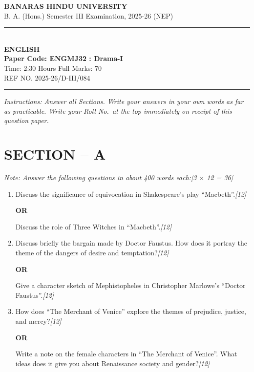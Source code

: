 \documentclass[11pt,a4paper]{article}
\newcommand{\pts}[1]{\hfill \textit{[#1]}}
\begin{document}
\begin{center}
  {\large\bfseries BANARAS HINDU UNIVERSITY}\\[2pt]
  {\normalsize B. A. (Hons.) Semester III Examination, 2025-26 (NEP)}\\[6pt]
  \rule{0.8\linewidth}{0.5pt}\\[6pt]
  {\large\bfseries ENGLISH}\\[4pt]
  {\large\bfseries Paper Code: ENGMJ32 : Drama-I}\\[4pt]
  {\normalsize Time: 2:30 Hours \hfill Full Marks: 70}\\[2pt]
  {\small REF NO. 2025-26/D-III/084}
\end{center}
\rule{\linewidth}{0.4pt}
\smallskip

\noindent \textit{Instructions: Answer all Sections. Write your answers in your own words as far as practicable. Write your Roll No.\ at the top immediately on receipt of this question paper.}

\bigskip

\section*{SECTION -- A}
\noindent \textit{Note: Answer the following questions in about 400 words each:}\pts{3 $\times$ 12 = 36}

\begin{enumerate}[label=\textbf{\arabic*.},leftmargin=*,itemsep=12pt]

  \item Discuss the significance of equivocation in Shakespeare's play ``Macbeth''.\pts{12}

  \begin{center}\textbf{OR}\end{center}

  Discuss the role of Three Witches in ``Macbeth''.\pts{12}

  \item Discuss briefly the bargain made by Doctor Faustus. How does it portray the theme of the dangers of desire and temptation?\pts{12}

  \begin{center}\textbf{OR}\end{center}

  Give a character sketch of Mephistopheles in Christopher Marlowe's ``Doctor Faustus''.\pts{12}

  \item How does ``The Merchant of Venice'' explore the themes of prejudice, justice, and mercy?\pts{12}

  \begin{center}\textbf{OR}\end{center}

  Write a note on the female characters in ``The Merchant of Venice''. What ideas does it give you about Renaissance society and gender?\pts{12}

\end{enumerate}
\end{document}
